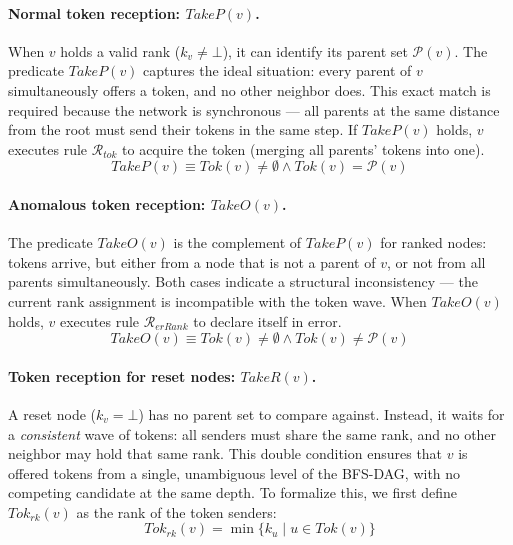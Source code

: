 \documentclass[a4paper, 12pt]{article}
\newcommand{\Pa}{\mathcal{P}}
\newcommand{\rk}{k}
\newcommand{\RerRank}{$\mathscr{R}_{erRank}$}
\newcommand{\Rtok}{$\mathscr{R}_{tok}$}
\begin{document}
\paragraph*{Normal token reception: $\mathit{TakeP}(v)$.}
When $v$ holds a valid rank ($\rk_v \neq \bot$), it can identify its parent set $\Pa(v)$.
The predicate $\mathit{TakeP}(v)$ captures the ideal situation: every parent of $v$
simultaneously offers a token, and no other neighbor does. This exact match is required
because the network is synchronous — all parents at the same distance from the root must
send their tokens in the same step. If $\mathit{TakeP}(v)$ holds, $v$ executes rule
\Rtok\/ to acquire the token (merging all parents' tokens into one).
\begin{equation}
    \mathit{TakeP}(v) \equiv \mathit{Tok}(v) \neq \emptyset
                          \wedge \mathit{Tok}(v) = \Pa(v)
    \label{eq:TakeP}
\end{equation}

\paragraph*{Anomalous token reception: $\mathit{TakeO}(v)$.}
The predicate $\mathit{TakeO}(v)$ is the complement of $\mathit{TakeP}(v)$ for ranked
nodes: tokens arrive, but either from a node that is not a parent of $v$, or not from all
parents simultaneously. Both cases indicate a structural inconsistency — the current rank
assignment is incompatible with the token wave. When $\mathit{TakeO}(v)$ holds, $v$
executes rule \RerRank\/ to declare itself in error.
\begin{equation}
    \mathit{TakeO}(v) \equiv \mathit{Tok}(v) \neq \emptyset
                           \wedge \mathit{Tok}(v) \neq \Pa(v)
    \label{eq:TakeO}
\end{equation}

\paragraph*{Token reception for reset nodes: $\mathit{TakeR}(v)$.}
A reset node ($\rk_v = \bot$) has no parent set to compare against. Instead, it waits
for a \emph{consistent} wave of tokens: all senders must share the same rank, and no
other neighbor may hold that same rank. This double condition ensures that $v$ is offered
tokens from a single, unambiguous level of the BFS-DAG, with no competing candidate at
the same depth. To formalize this, we first define $\mathit{Tok}_{rk}(v)$ as the rank of
the token senders:
\begin{equation}
    \mathit{Tok}_{rk}(v) = \min\bigl\{\rk_u \mid u \in \mathit{Tok}(v)\bigr\}
    \label{eq:TokRk}
\end{equation}
\end{document}
